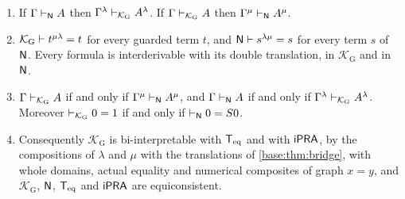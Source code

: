 \begin{theorem}\label{ctr:thm:gequiv}
\leavevmode
\begin{enumerate}
\item If $\Gamma\vdash_{\mathsf{N}}A$ then $\Gamma^\lambda\vdash_{\mathcal K_{\mathrm G}}A^\lambda$.
If $\Gamma\vdash_{\mathcal K_{\mathrm G}}A$ then $\Gamma^\mu\vdash_{\mathsf{N}}A^\mu$.
\item $\mathcal K_{\mathrm G}\vdash t^{\mu\lambda}=t$ for every guarded term $t$, and
$\mathsf{N}\vdash s^{\lambda\mu}=s$ for every term $s$ of $\mathsf{N}$. Every formula is
interderivable with its double translation, in $\mathcal K_{\mathrm G}$ and in $\mathsf{N}$.
\item $\Gamma\vdash_{\mathcal K_{\mathrm G}}A$ if and only if $\Gamma^\mu\vdash_{\mathsf{N}}A^\mu$,
and $\Gamma\vdash_{\mathsf{N}}A$ if and only if $\Gamma^\lambda\vdash_{\mathcal K_{\mathrm G}}A^\lambda$.
Moreover $\vdash_{\mathcal K_{\mathrm G}}0=1$ if and only if $\vdash_{\mathsf{N}}0=S 0$.
\item Consequently $\mathcal K_{\mathrm G}$ is bi-interpretable with $\mathsf{T}_{\mathrm{eq}}$ and with $\mathsf{iPRA}$,
by the compositions of $\lambda$ and $\mu$ with the translations of \cref{base:thm:bridge},
with whole domains, actual equality and numerical composites of graph $x=y$, and
$\mathcal K_{\mathrm G}$, $\mathsf{N}$, $\mathsf{T}_{\mathrm{eq}}$ and $\mathsf{iPRA}$ are equiconsistent.
\end{enumerate}
\end{theorem}
